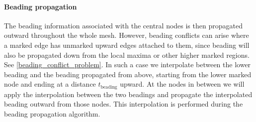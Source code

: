 \paragraph{Beading propagation}
The beading information associated with the central nodes is then propagated outward throughout the whole mesh.
However, beading conflicts can arise where a marked edge has unmarked upward edges attached to them, since beading will also be propagated down from the local maxima or other higher marked regions.
See \cref{beading_conflict_problem}.
In such a case we interpolate between the lower beading and the beading propagated from above,
starting from the lower marked node and ending at a distance $t_\text{beading}$ upward.
At the nodes in between we will apply the interpolation between the two beadings and propagate the interpolated beading outward from those nodes.
This interpolation is performed during the beading propagation algorithm.

\fi

